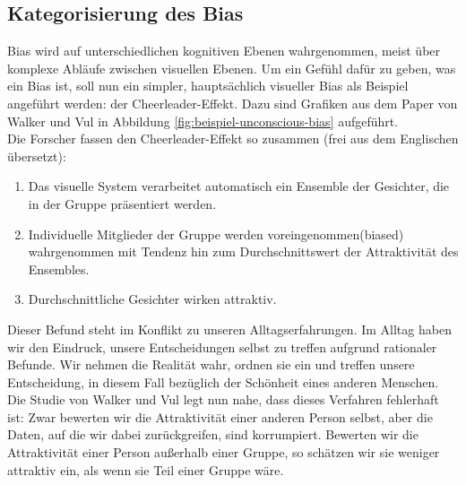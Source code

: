 \subsection{Kategorisierung des Bias}
Bias wird auf unterschiedlichen kognitiven Ebenen wahrgenommen, meist über komplexe Abläufe zwischen visuellen Ebenen. Um ein Gefühl dafür zu geben, was ein Bias ist, soll nun ein simpler, hauptsächlich visueller Bias als Beispiel angeführt werden: der Cheerleader-Effekt. Dazu sind Grafiken aus dem Paper von Walker und Vul \cite{WAL14} in Abbildung \ref{fig:beispiel-unconscious-bias} aufgeführt. \\

Die Forscher fassen den Cheerleader-Effekt so zusammen (frei aus dem Englischen übersetzt):
\begin{enumerate}
	\item Das visuelle System verarbeitet automatisch ein Ensemble der Gesichter, die in der Gruppe präsentiert werden.
	\item Individuelle Mitglieder der Gruppe werden voreingenommen(\glqq biased\grqq) wahrgenommen mit Tendenz hin zum Durchschnittswert der Attraktivität des Ensembles.
	\item Durchschnittliche Gesichter wirken attraktiv.
\end{enumerate}

Dieser Befund steht im Konflikt zu unseren Alltagserfahrungen. Im Alltag haben wir den Eindruck, unsere Entscheidungen selbst zu treffen aufgrund rationaler Befunde. Wir nehmen die Realität wahr, ordnen sie ein und treffen unsere Entscheidung, in diesem Fall bezüglich der Schönheit eines anderen Menschen. Die Studie von Walker und Vul legt nun nahe, dass dieses Verfahren fehlerhaft ist: Zwar bewerten wir die Attraktivität einer anderen Person selbst, aber die Daten, auf die wir dabei zurückgreifen, sind korrumpiert. Bewerten wir die Attraktivität einer Person außerhalb einer Gruppe, so schätzen wir sie weniger attraktiv ein, als wenn sie Teil einer Gruppe wäre. \\

